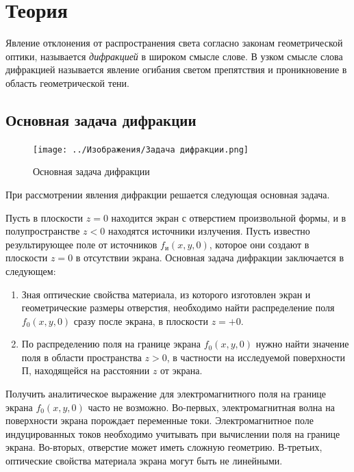 \section*{Теория}

Явление отклонения от распространения света согласно законам геометрической оптики, называется \textit{дифракцией} в широком смысле слове. В узком смысле слова дифракцией называется явление огибания светом препятствия и проникновение в область геометрической тени.

\subsection*{Основная задача дифракции}

\begin{figure}
	\centering
	\texttt{[image: ../Изображения/Задача
	 дифракции.png]}
	\caption{Основная задача дифракции}
\end{figure}

При рассмотрении явления дифракции решается следующая основная задача.

Пусть в плоскости $z = 0$ находится экран с отверстием 
произвольной формы, и в полупространстве $z < 0$ находятся 
источники излучения. Пусть известно результирующее поле от 
источников $f_и(x, y, 0)$, которое они создают в плоскости $z 
= 0$ в отсутствии экрана. Основная задача дифракции 
заключается в следующем:
\\
\begin{enumerate}
	\item Зная оптические свойства материала, из которого изготовлен экран и геометрические размеры отверстия, необходимо найти распределение поля $f_0(x, y, 0)$ сразу после экрана, в плоскости $z = +0$.
		
	\item По распределению поля на границе экрана $f_0(x, y, 0)$ нужно найти значение поля в области пространства $z > 0$, в частности на исследуемой поверхности $П$, находящейся на расстоянии $z$ от экрана.
\end{enumerate}

Получить аналитическое выражение для электромагнитного поля на границе экрана $f_0(x, y, 0)$ часто не возможно. Во-первых, электромагнитная волна на поверхности экрана порождает переменные токи. Электромагнитное поле индуцированных токов необходимо учитывать при вычислении поля на границе экрана. Во-вторых, отверстие может иметь сложную геометрию. В-третьих, оптические свойства материала экрана могут быть не линейными.

